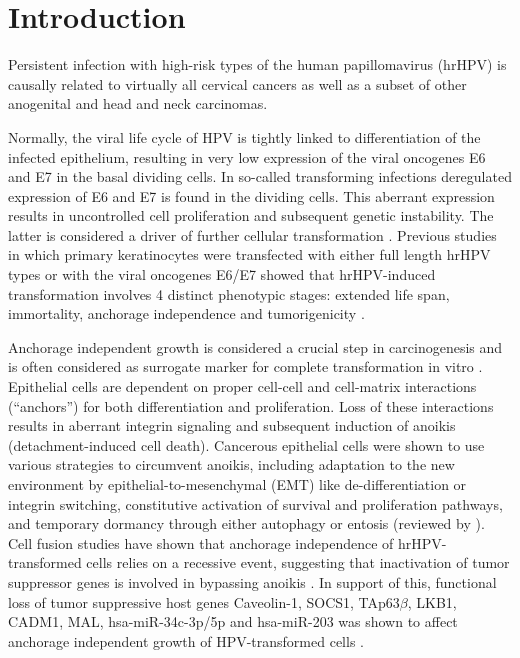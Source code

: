 \section{Introduction}

Persistent infection with high-risk types of the human papillomavirus (hrHPV) is causally related to virtually all cervical cancers as well as a subset of other anogenital and head and neck carcinomas. 

Normally, the viral life cycle of HPV is tightly linked to differentiation of the infected epithelium, resulting in very low expression of the viral oncogenes E6 and E7 in the basal dividing cells. In so-called transforming infections deregulated expression of E6 and E7 is found in the dividing cells. This aberrant expression results in uncontrolled cell proliferation and subsequent genetic instability. The latter is considered a driver of further cellular transformation \cite{Doorbar2006}. Previous studies in which primary keratinocytes were transfected with either full length hrHPV types or with the viral oncogenes E6/E7 showed that hrHPV-induced transformation involves 4 distinct phenotypic stages: extended life span, immortality, anchorage independence and tumorigenicity \cite{Chen1993, Schutze2014}.

Anchorage independent growth is considered a crucial step in carcinogenesis and is often considered as surrogate marker for complete transformation in vitro \cite{Freedman1974, Mori2009}. Epithelial cells are dependent on proper cell-cell and cell-matrix interactions (“anchors”) for both differentiation and proliferation. Loss of these interactions results in aberrant integrin signaling and subsequent induction of anoikis (detachment-induced cell death). Cancerous epithelial cells were shown to use various strategies to circumvent anoikis, including adaptation to the new environment by epithelial-to-mesenchymal (EMT) like de-differentiation or integrin switching, constitutive activation of survival and proliferation pathways, and temporary dormancy through either autophagy or entosis (reviewed by \cite{Guadamillas2011}). Cell fusion studies have shown that anchorage independence of hrHPV-transformed cells relies on a recessive event, suggesting that inactivation of tumor suppressor genes is involved in bypassing anoikis \cite{Chen1993}. In support of this, functional loss of tumor suppressive host genes Caveolin-1, SOCS1, TAp63$\beta$, LKB1, CADM1, MAL, hsa-miR-34c-3p/5p and hsa-miR-203 was shown to affect anchorage independent growth of HPV-transformed cells \cite{Khalifa2011, Kamio2004, Mack2013, Overmeer2009, Razani2000, Steenbergen2004, Wilting2013,Lopez2011}. 


